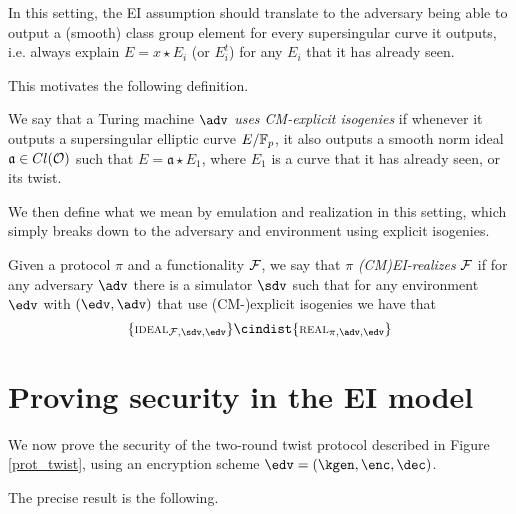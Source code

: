 In this setting, the EI assumption should translate to the adversary being able to output a (smooth) class group element for every supersingular curve it outputs, i.e. always explain $E=x\star E_i$ (or $E_i^t$) for any $E_i$ that it has already seen.

This motivates the following definition.

\begin{definition}
    We say that a Turing machine $\adv$ \emph{uses CM-explicit isogenies} if whenever it outputs a supersingular elliptic curve $E/\mathbb{F}_p$, it also outputs a smooth norm ideal $\mathfrak a\in Cl(\mathcal{O})$ such that $E=\mathfrak a\star E_1$, where $E_1$ is a curve that it has already seen, or its twist.
\end{definition}

We then define what we mean by emulation and realization in this setting, which simply breaks down to the adversary and environment using explicit isogenies.

\begin{definition}
        Given a protocol $\pi$ and a functionality $\mathcal{F}$, we say that $\pi$ \emph{(CM)EI-realizes} $\mathcal{F}$ if for any adversary $\adv$ there is a simulator $\sdv$ such that for any environment $\edv$ with $(\edv,\adv)$ that use (CM-)explicit isogenies we have that
    $$\{\textsc{\scriptsize IDEAL}_{\Fun,\sdv,\edv} \} \cindist \{\textsc{\scriptsize REAL}_{\pi,\adv,\edv} \}$$
\end{definition}


\section{Proving security in the EI model}
We now prove the security of the two-round twist protocol described in Figure \ref{prot_twist}, using an encryption scheme $\edv=(\kgen, \enc, \dec)$.

The precise result is the following.


